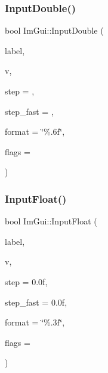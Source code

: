 \mbox{\label{namespaceImGui_ad941c3cfa561ca35b674fd5802bcf870}} 
\subsubsection{\texorpdfstring{Input\+Double()}{InputDouble()}}
{\footnotesize\ttfamily bool Im\+Gui\+::\+Input\+Double (\begin{DoxyParamCaption}\item[{const char $\ast$}]{label,  }\item[{double $\ast$}]{v,  }\item[{double}]{step = {},  }\item[{double}]{step\+\_\+fast = {},  }\item[{const char $\ast$}]{format = {\ttfamily \char`\"{}\%.6f\char`\"{}},  }\item[{Im\+Gui\+Input\+Text\+Flags}]{flags = {} }\end{DoxyParamCaption})}

\mbox{\label{namespaceImGui_a36b86c9d7226f18c316400c83a904454}} 
\subsubsection{\texorpdfstring{Input\+Float()}{InputFloat()}}
{\footnotesize\ttfamily bool Im\+Gui\+::\+Input\+Float (\begin{DoxyParamCaption}\item[{const char $\ast$}]{label,  }\item[{float $\ast$}]{v,  }\item[{float}]{step = {\ttfamily 0.0f},  }\item[{float}]{step\+\_\+fast = {\ttfamily 0.0f},  }\item[{const char $\ast$}]{format = {\ttfamily \char`\"{}\%.3f\char`\"{}},  }\item[{Im\+Gui\+Input\+Text\+Flags}]{flags = {} }\end{DoxyParamCaption})}

\mbox{\label{namespaceImGui_a854ba6decd4ae7e4b0980a9c71bfa47d}} 
